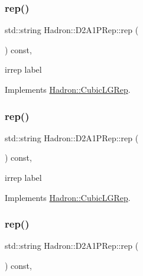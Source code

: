 \subsubsection{\texorpdfstring{rep()}{rep()}\hspace{0.1cm}{\footnotesize\ttfamily [1/3]}}
{\footnotesize\ttfamily std\+::string Hadron\+::\+D2\+A1\+P\+Rep\+::rep (\begin{DoxyParamCaption}{ }\end{DoxyParamCaption}) const\hspace{0.3cm}{\ttfamily [inline]}, {\ttfamily [virtual]}}

irrep label 

Implements \mbox{\hyperlink{structHadron_1_1CubicLGRep_a50f5ddbb8f4be4cee0106fa9e8c75e6c}{Hadron\+::\+Cubic\+L\+G\+Rep}}.

\mbox{\label{structHadron_1_1D2A1PRep_a127d5b4fc80ab71a7b8f3356713d4976}} 
\subsubsection{\texorpdfstring{rep()}{rep()}\hspace{0.1cm}{\footnotesize\ttfamily [2/3]}}
{\footnotesize\ttfamily std\+::string Hadron\+::\+D2\+A1\+P\+Rep\+::rep (\begin{DoxyParamCaption}{ }\end{DoxyParamCaption}) const\hspace{0.3cm}{\ttfamily [inline]}, {\ttfamily [virtual]}}

irrep label 

Implements \mbox{\hyperlink{structHadron_1_1CubicLGRep_a50f5ddbb8f4be4cee0106fa9e8c75e6c}{Hadron\+::\+Cubic\+L\+G\+Rep}}.

\mbox{\label{structHadron_1_1D2A1PRep_a127d5b4fc80ab71a7b8f3356713d4976}} 
\subsubsection{\texorpdfstring{rep()}{rep()}\hspace{0.1cm}{\footnotesize\ttfamily [3/3]}}
{\footnotesize\ttfamily std\+::string Hadron\+::\+D2\+A1\+P\+Rep\+::rep (\begin{DoxyParamCaption}{ }\end{DoxyParamCaption}) const\hspace{0.3cm}{\ttfamily [inline]}, {\ttfamily [virtual]}}

